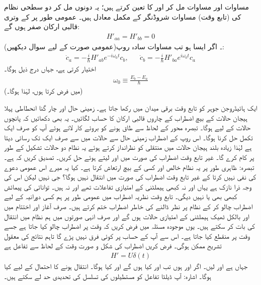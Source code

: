 مساوات  اور مساوات   مل کر  اور   کا  تعین کرتے ہیں؛   یہ دونوں مل کر دو  سطحی  نظام کی  (تابع وقت)  مساوات شروڈنگر کے مکمل معادل ہیں۔ عمومی طور پر  کے وتری قالبی  ارکان  صفر ہوں گے:
\begin{align}
	H'_{aa}=H'_{bb}=0
\end{align}
 (عمومی صورت کے لیے سوال   دیکھیں)۔ اگر ایسا ہو تب مساوات سادہ روپ:
\begin{align}
	\dot{c}_a=-\frac{i}{\hslash}H'_{ab}e^{-i\omega_0t}c_b,&&\dot{c}_b=-\frac{i}{\hslash}H'_{ba}e^{i\omega_0t}c_a
\end{align}
 اختیار کرتی ہے، جہاں درج ذیل ہوگا۔
\begin{align}
	\omega_0\equiv\frac{E_b-E_a}{\hslash}
\end{align}
(میں  فرض کرتا ہوں،  لہٰذا  ہوگا۔)


ایک ہائیڈروجن جوہر کو تابع وقت برقی میدان  میں رکھا جاتا ہے۔ زمینی حال  اور چار گنا انحطاطی پہلا ہیجان حالات  کے بیچ اضطراب  کے چاروں قالبی ارکان  کا حساب لگائیں۔ یہ بھی دکھائیں کہ پانچوں حالات کے لیے  ہوگا۔ تبصرہ محور  کے لحاظ سے طاق ہونے کو بروئے کار لاتے ہوئے آپ کو صرف ایک تکمل حل کرنا ہوگا۔ اس روپ کے اضطراب زمینی حال سے  حالات میں سے صرف ایک تک رسائی دیتا ہے لہٰذا زیادہ بلند ہیجان حالات میں منتقلی کو نظرانداز کرتے ہوئے یہ نظام دو حالات تشکیل  کے طور پر کام کرے گا۔
غیر تابع وقت اضطراب کی صورت میں  اور  لیتے ہوئے  حل کریں۔ تصدیق کریں  کہ  ہے۔ تبصرہ: ظاہری طور پر یہ نظام خالص  اور کسی  کے بیچ ارتعاش کرتا ہے۔ کیا یہ میرے اس عمومی دعوے کی نفی نہیں کرتا کے غیر تابع وقت اضطراب کی صورت میں انتقال نہیں ہوگا؟ جی نہیں لیکن اس کی وجہ ذرا نازک ہے یہاں  اور  نہ کبھی ہیملٹنی کے امتیازی تفاعلات تھے اور نہ ہیں۔ توانائی کی پیمائش کبھی بھی  یا  نہیں دیگی۔ تابع وقت نظریہ اضطراب میں عمومی طور پر ہم کسی دورانیہ کے لیے اضطراب چالو کر کے نظام پر نظر ڈالنے کی خاطر اضطراب ختم کرتے ہیں۔ صرف آغاز اور اختتام میں  اور  بالکل ٹھیک ہیملٹنی کے امتیازی حالات ہوں گے اور صرف انہی صورتوں میں ہم نظام میں انتقال کی بات کر سکتے ہیں۔ یوں موجودہ مسئلہ میں فرض کریں  کہ وقت  پر اضطراب چالو کیا جاتا ہے جسے وقت  پر منقطع کیا جاتا ہے۔ اس سے آپ کے حساب پر کوئی فرق نہیں پڑے گا تاہم نتائج کی معقول تشریح ممکن ہوگی۔
فرض کریں اضطراب کی شکل و صورت وقت کے لحاظ سے  تفاعل ہے
\begin{align*}
	H'=U\delta(t)
\end{align*}
جہاں  ہے اور  لیں۔ اگر  اور  ہوں تب  اور  کیا ہوں گے اور کیا  ہوگا۔ انتقال ہونے کا احتمال  کے لیے  کیا ہوگا۔ اشارہ: آپ ڈیلٹا تفاعل کو مستطیلوں کی تسلسل کی تحدیدی حد لے سکتے ہیں۔

